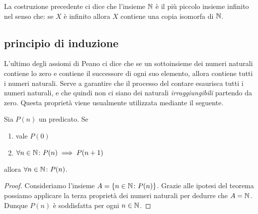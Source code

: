 La costruzione precedente ci dice che l'insieme ${\mathbb N}$ è il più piccolo insieme infinito
nel senso che: se $X$ è infinito allora $X$ contiene una copia isomorfa di ${\mathbb N}$. 

\subsection{principio di induzione}

L'ultimo degli assiomi di Peano 
ci dice che se un sottoinsieme dei numeri naturali contiene lo 
zero e contiene il successore di ogni suo elemento, allora contiene tutti i 
numeri naturali.
Serve a garantire che il processo del contare esaurisca tutti 
i numeri naturali, e che quindi non ci siano dei naturali \emph{irraggiungibili}
partendo da zero.
Questa proprietà viene usualmente utilizzata mediante il seguente.


%
%
\begin{theorem}
  Sia $P(n)$ un predicato.
  Se 
  \begin{enumerate}
    \item vale $P(0)$
    \item $\forall n\in {\mathbb N}\colon P(n)\implies P(n+1)$
  \end{enumerate} 
  allora $\forall n\in {\mathbb N}\colon P(n)$.
\end{theorem}
%
\begin{proof}
  Consideriamo l'insieme $A=\{n\in {\mathbb N}\colon P(n)\}$.
  Grazie alle ipotesi del teorema possiamo applicare la terza
  proprietà dei numeri naturali per dedurre che $A={\mathbb N}$.
  Dunque $P(n)$ è soddisfatta per ogni $n\in{\mathbb N}$.
\end{proof}

